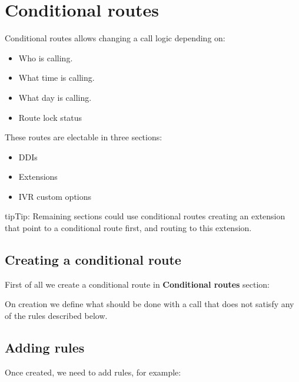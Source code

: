 \documentclass[letterpaper,10pt,english]{sphinxmanual}
\begin{document}
\section{Conditional routes}
\label{pbx_features/conditional_routes::doc}\label{pbx_features/conditional_routes:conditional-routes}\label{pbx_features/conditional_routes:id1}
Conditional routes allows changing a call logic depending on:
\begin{itemize}
\item {} 
Who is calling.

\item {} 
What time is calling.

\item {} 
What day is calling.

\item {} 
Route lock status

\end{itemize}

These routes are electable in three sections:
\begin{itemize}
\item {} 
DDIs

\item {} 
Extensions

\item {} 
IVR custom options

\end{itemize}

\begin{notice}{tip}{Tip:}
Remaining sections could use conditional routes creating an extension
that point to a conditional route first, and routing to this extension.
\end{notice}


\subsection{Creating a conditional route}
\label{pbx_features/conditional_routes:creating-a-conditional-route}
First of all we create a conditional route in \textbf{Conditional routes} section:

\noindent{}

On creation we define what should be done with a call that does not satisfy any
of the rules described below.


\subsection{Adding rules}
\label{pbx_features/conditional_routes:adding-rules}
Once created, we need to add rules, for example:
\end{document}
